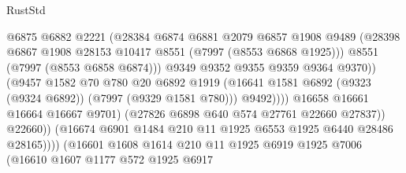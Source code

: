 \begin{lexlean}{RustStd}
\begin{coremodule}
                                        @6875
                                        @6882
                                        @2221
                                        (@28384
                                          @6874
                                          @6881
                                          @2079
                                          @6857
                                          @1908
                                          @9489
                                          (@28398
                                            @6867
                                            @1908
                                            @28153
                                            @10417
                                            @8551
                                            (@7997 (@8553 @6868 @1925)))
                                          @8551
                                          (@7997 (@8553 @6858 @6874)))
                                        @9349
                                        @9352
                                        @9355
                                        @9359
                                        @9364
                                        @9370))
                                    (@9457
                                      @1582
                                      @70
                                      @780
                                      @20
                                      @6892
                                      @1919
                                      (@16641
                                        @1581
                                        @6892
                                        (@9323 (@9324 @6892))
                                        (@7997 (@9329 @1581 @780)))
                                      @9492))))
                              @16658
                              @16661
                              @16664
                              @16667
                              @9701)
                            (@27826 @6898 @640 @574 @27761 @22660 @27837))
                          @22660))
                      (@16674 @6901 @1484 @210 @11 @1925 @6553 @1925 @6440 @28486 @28165))))
                (@16601
                  @1608
                  @1614
                  @210
                  @11
                  @1925
                  @6919
                  @1925
                  @7006
                  (@16610
                    @1607
                    @1177
                    @572
                    @1925
                    @6917

\end{coremodule}
\end{lexlean}
